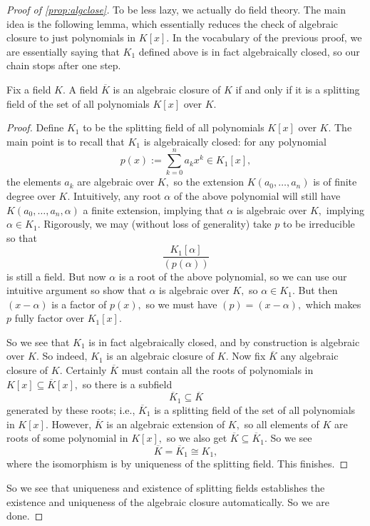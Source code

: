 \begin{proof}[Proof of \autoref{prop:algclose}]
	To be less lazy, we actually do field theory. The main idea is the following lemma, which essentially reduces the check of algebraic closure to just polynomials in $K[x].$ In the vocabulary of the previous proof, we are essentially saying that $K_1$ defined above is in fact algebraically closed, so our chain stops after one step.
	\begin{lemma}
		Fix a field $K.$ A field $\overline K$ is an algebraic closure of $K$ if and only if it is a splitting field of the set of all polynomials $K[x]$ over $K.$
	\end{lemma}
	\begin{proof}
		Define $K_1$ to be the splitting field of all polynomials $K[x]$ over $K.$ The main point is to recall that $K_1$ is algebraically closed: for any polynomial
		\[p(x):=\sum_{k=0}^na_kx^k\in K_1[x],\]
		the elements $a_k$ are algebraic over $K,$ so the extension $K(a_0,\ldots,a_n)$ is of finite degree over $K.$ Intuitively, any root $\alpha$ of the above polynomial will still have $K(a_0,\ldots,a_n,\alpha)$ a finite extension, implying that $\alpha$ is algebraic over $K,$ implying $\alpha\in K_1.$ Rigorously, we may (without loss of generality) take $p$ to be irreducible so that
		\[\frac{K_1[\alpha]}{(p(\alpha))}\]
		is still a field. But now $\alpha$ is a root of the above polynomial, so we can use our intuitive argument so show that $\alpha$ is algebraic over $K,$ so $\alpha\in K_1.$ But then $(x-\alpha)$ is a factor of $p(x),$ so we must have $(p)=(x-\alpha),$ which makes $p$ fully factor over $K_1[x].$

		So we see that $K_1$ is in fact algebraically closed, and by construction is algebraic over $K.$ So indeed, $K_1$ is an algebraic closure of $K.$ Now fix $\overline K$ any algebraic closure of $K.$ Certainly $\overline K$ must contain all the roots of polynomials in $K[x]\subseteq\overline K[x],$ so there is a subfield
		\[\overline K_1\subseteq\overline K\]
		generated by these roots; i.e., $\overline K_1$ is a splitting field of the set of all polynomials in $K[x].$ However, $\overline K$ is an algebraic extension of $K,$ so all elements of $K$ are roots of some polynomial in $K[x],$ so we also get $\overline K\subseteq\overline K_1.$ So we see
		\[\overline K=\overline K_1\cong K_1,\]
		where the isomorphism is by uniqueness of the splitting field. This finishes.
	\end{proof}
	So we see that uniqueness and existence of splitting fields establishes the existence and uniqueness of the algebraic closure automatically. So we are done.
\end{proof}

